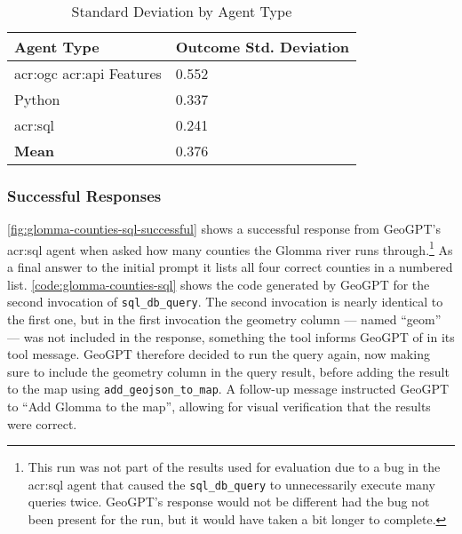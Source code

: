\begin{table}[htbp]
    \centering
    \caption{Standard Deviation by Agent Type}
    \label{tbl:stddev-by-agent-type}
    \begin{tabularx}{0.7\textwidth}{XX}
        \toprule
        \textbf{Agent Type}                            & \textbf{Outcome Std. Deviation} \\
        \midrule
        \acrshort{acr:ogc} \acrshort{acr:api} Features & 0.552                           \\
        Python                                         & 0.337                           \\
        \acrshort{acr:sql}                             & 0.241                           \\
        \midrule
        \textbf{Mean}                                  & 0.376                           \\
        \bottomrule
    \end{tabularx}
\end{table}

\subsubsection{Successful Responses}

\autoref{fig:glomma-counties-sql-successful} shows a successful response from GeoGPT's \acrshort{acr:sql} agent when asked how many counties the Glomma river runs through.\footnote{This run was not part of the results used for evaluation due to a bug in the \acrshort{acr:sql} agent that caused the \texttt{sql\_db\_query} to unnecessarily execute many queries twice. GeoGPT's response would not be different had the bug not been present for the run, but it would have taken a bit longer to complete.} As a final answer to the initial prompt it lists all four correct counties in a numbered list. \autoref{code:glomma-counties-sql} shows the code generated by GeoGPT for the second invocation of \texttt{sql\_db\_query}. The second invocation is nearly identical to the first one, but in the first invocation the geometry column --- named \enquote{geom} --- was not included in the response, something the tool informs GeoGPT of in its tool message. GeoGPT therefore decided to run the query again, now making sure to include the geometry column in the query result, before adding the result to the map using \texttt{add\_geojson\_to\_map}. A follow-up message instructed GeoGPT to \enquote{Add Glomma to the map}, allowing for visual verification that the results were correct.

